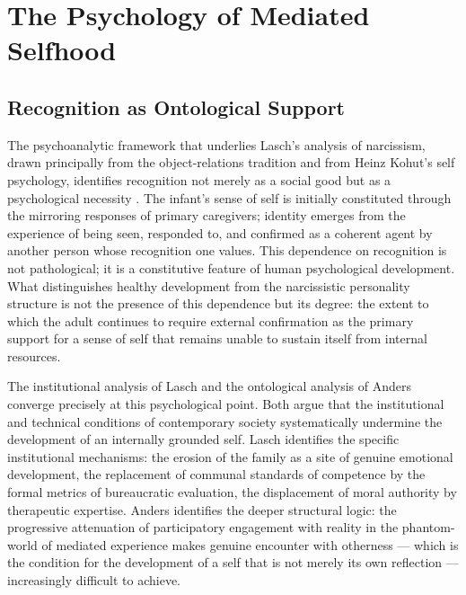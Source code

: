 \documentclass[12pt]{memoir}
\begin{document}
\section{The Psychology of Mediated Selfhood}
\label{sec:psychology}

\subsection{Recognition as Ontological Support}

The psychoanalytic framework that underlies Lasch's analysis of narcissism, drawn
principally from the object-relations tradition and from Heinz Kohut's self psychology,
identifies recognition not merely as a social good but as a psychological necessity
\citep{kohut1971analysis}. The infant's sense of self is initially constituted through
the mirroring responses of primary caregivers; identity emerges from the experience of
being seen, responded to, and confirmed as a coherent agent by another person whose
recognition one values. This dependence on recognition is not pathological; it is a
constitutive feature of human psychological development. What distinguishes healthy
development from the narcissistic personality structure is not the presence of this
dependence but its degree: the extent to which the adult continues to require external
confirmation as the primary support for a sense of self that remains unable to sustain
itself from internal resources.

The institutional analysis of Lasch and the ontological analysis of Anders converge
precisely at this psychological point. Both argue that the institutional and technical
conditions of contemporary society systematically undermine the development of an
internally grounded self. Lasch identifies the specific institutional mechanisms:
the erosion of the family as a site of genuine emotional development, the replacement
of communal standards of competence by the formal metrics of bureaucratic evaluation,
the displacement of moral authority by therapeutic expertise. Anders identifies the
deeper structural logic: the progressive attenuation of participatory engagement with
reality in the phantom-world of mediated experience makes genuine encounter with
otherness — which is the condition for the development of a self that is not merely
its own reflection — increasingly difficult to achieve.
\end{document}
